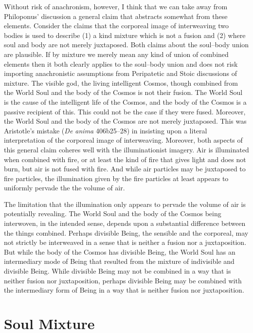 Without risk of anachronism, however, I think that we can take away from Philoponus' discussion a general claim that abstracts somewhat from these elements. Consider the claims that the corporeal image of interweaving two bodies is used to describe (1) a kind mixture which is not a fusion and (2) where soul and body are not merely juxtaposed. Both claims about the soul--body union are plausible. If by mixture we merely mean any kind of union of combined elements then it both clearly applies to the soul--body union and does not risk importing anachronistic assumptions from Peripatetic and Stoic discussions of mixture.  The visible god, the living intelligent Cosmos, though combined from the World Soul and the body of the Cosmos is not their fusion. The World Soul is the cause of the intelligent life of the Cosmos, and the body of the Cosmos is a passive recipient of this. This could not be the case if they were fused. Moreover, the World Soul and the body of the Cosmos are not merely juxtaposed. This was Aristotle's mistake (\emph{De anima} 406b25--28) in insisting upon a literal interpretation of the corporeal image of interweaving. Moreover, both aspects of this general claim coheres well with the illuminationist imagery. Air is illuminated when combined with fire, or at least the kind of fire that gives light and does not burn, but air is not fused with fire. And while air particles may be juxtaposed to fire particles, the illumination given by the fire particles at least appears to uniformly pervade the the volume of air. 

The limitation that the illumination only appears to pervade the volume of air is potentially revealing. The World Soul and the body of the Cosmos being interwoven, in the intended sense, depends upon a substantial difference between the things combined. Perhaps divisible Being, the sensible and the corporeal, may not strictly be interweaved in a sense that is neither a fusion nor a juxtaposition. But while the body of the Cosmos has divisible Being, the World Soul has an intermediary mode of Being that resulted from the mixture of indivisible and divisible Being. While divisible Being may not be combined in a way that is neither fusion nor juxtaposition, perhaps divisible Being may be combined with the intermediary form of Being in a way that is neither fusion nor juxtaposition.


\section{Soul Mixture} %
\label{sec:soul_mixture}

